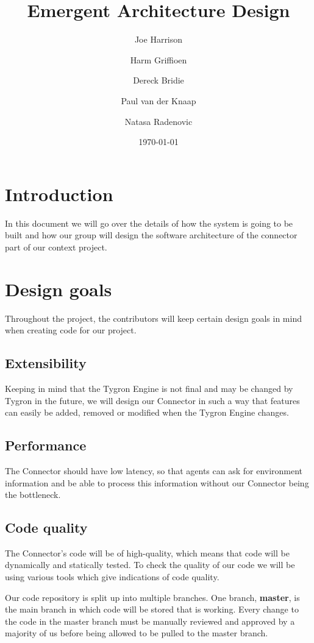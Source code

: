 \documentclass[a4paper]{article}
\title{Emergent Architecture Design}
\author{Joe Harrison \and Harm Griffioen \and Dereck Bridie \and Paul van der Knaap \and Natasa Radenovic}
\date{\today}
\begin{document}
\maketitle

\section{Introduction}
In this document we will go over the details of how the system is going to be built and how our group will design the software architecture of the connector part of our context project. 

\section{Design goals}
Throughout the project, the contributors will keep certain design goals in mind when creating code for our project.

\subsection{Extensibility}
Keeping in mind that the Tygron Engine is not final and may be changed by Tygron in the future, we will design our Connector in such a way that features can easily be added, removed or modified when the Tygron Engine changes.


\subsection{Performance}
The Connector should have low latency, so that agents can ask for environment information and be able to process this information without our Connector being the bottleneck. 


\subsection{Code quality}
The Connector's code will be of high-quality, which means that code will be dynamically and statically tested. To check the quality of our code we will be using various tools which give indications of code quality. 

Our code repository is split up into multiple branches. One branch, \textbf{master}, is the main branch in which code will be stored that is working. Every change to the code in the master branch must be manually reviewed and approved by a majority of us before being allowed to be pulled to the master branch.
\end{document}
